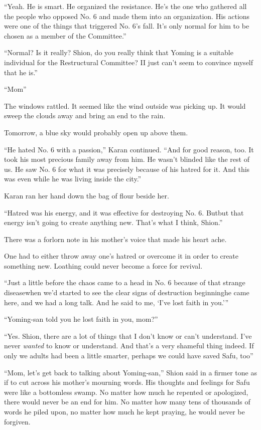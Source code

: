 ``Yeah. He is smart. He organized the resistance. He's the one who
gathered all the people who opposed No. 6 and made them into an
organization. His actions were one of the things that triggered No. 6's
fall. It's only normal for him to be chosen as a member of the
Committee.''

``Normal? Is it really? Shion, do you really think that Yoming is a
suitable individual for the Restructural Committee? I\el I just can't
seem to convince myself that he is.''

``Mom\el ''

The windows rattled. It seemed like the wind outside was picking up. It
would sweep the clouds away and bring an end to the rain.

Tomorrow, a blue sky would probably open up above them.

``He hated No. 6 with a passion,'' Karan continued. ``And for good
reason, too. It took his most precious family away from him. He wasn't
blinded like the rest of us. He saw No. 6 for what it was precisely
because of his hatred for it. And this was even while he was living
inside the city.''

Karan ran her hand down the bag of flour beside her.

``Hatred was his energy, and it was effective for destroying No. 6.
But\el but that energy isn't going to create anything new. That's what I
think, Shion.''

There was a forlorn note in his mother's voice that made his heart ache.

One had to either throw away one's hatred or overcome it in order to
create something new. Loathing could never become a force for revival.

``Just a little before the chaos came to a head in No. 6 because of that
strange disease\el when we'd started to see the clear signs of
destruction beginning\el he came here, and we had a long talk. And he
said to me, `I've lost faith in you.'''

``Yoming-san told you he lost faith in you, mom?''

``Yes. Shion, there are a lot of things that I don't know or can't
understand. I've never \emph{wanted} to know or understand. And that's a very
shameful thing indeed. If only we adults had been a little smarter,
perhaps we could have saved Safu, too\el ''

``Mom, let's get back to talking about Yoming-san,'' Shion said in a
firmer tone as if to cut across his mother's mourning words. His
thoughts and feelings for Safu were like a bottomless swamp. No matter
how much he repented or apologized, there would never be an end for him.
No matter how many tens of thousands of words he piled upon, no matter
how much he kept praying, he would never be forgiven.

